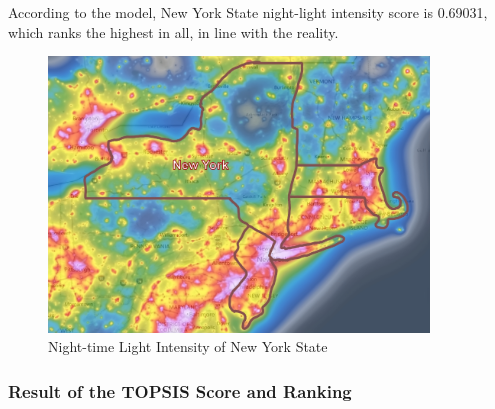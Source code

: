 According to the model, New York State night-light intensity score is 0.69031, which ranks the highest in all, in line with the reality.

\begin{figure}[H]\centering
    \includegraphics[width=0.9\textwidth]{figures/texted/New_York.jpg}
    \caption{Night-time Light Intensity of New York State} \label{fig:figure5}
\end{figure}

\subsubsection{Result of the TOPSIS Score and Ranking}

